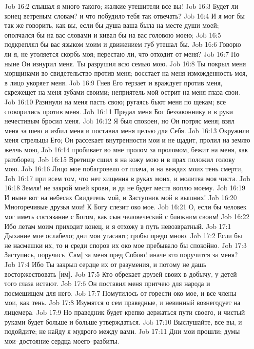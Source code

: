 Job 16:2  слышал я много такого; жалкие утешители все вы!
Job 16:3  Будет ли конец ветреным словам? и что побудило тебя так отвечать?
Job 16:4  И я мог бы так же говорить, как вы, если бы душа ваша была на месте души моей; ополчался бы на вас словами и кивал бы на вас головою моею;
Job 16:5  подкреплял бы вас языком моим и движением губ утешал бы.
Job 16:6  Говорю ли я, не утоляется скорбь моя; перестаю ли, что отходит от меня?
Job 16:7  Но ныне Он изнурил меня. Ты разрушил всю семью мою.
Job 16:8  Ты покрыл меня морщинами во свидетельство против меня; восстает на меня изможденность моя, в лицо укоряет меня.
Job 16:9  Гнев Его терзает и враждует против меня, скрежещет на меня зубами своими; неприятель мой острит на меня глаза свои.
Job 16:10  Разинули на меня пасть свою; ругаясь бьют меня по щекам; все сговорились против меня.
Job 16:11  Предал меня Бог беззаконнику и в руки нечестивым бросил меня.
Job 16:12  Я был спокоен, но Он потряс меня; взял меня за шею и избил меня и поставил меня целью для Себя.
Job 16:13  Окружили меня стрельцы Его; Он рассекает внутренности мои и не щадит, пролил на землю желчь мою,
Job 16:14  пробивает во мне пролом за проломом, бежит на меня, как ратоборец.
Job 16:15  Вретище сшил я на кожу мою и в прах положил голову мою.
Job 16:16  Лицо мое побагровело от плача, и на веждах моих тень смерти,
Job 16:17  при всем том, что нет хищения в руках моих, и молитва моя чиста.
Job 16:18  Земля! не закрой моей крови, и да не будет места воплю моему.
Job 16:19  И ныне вот на небесах Свидетель мой, и Заступник мой в вышних!
Job 16:20  Многоречивые друзья мои! К Богу слезит око мое.
Job 16:21  О, если бы человек мог иметь состязание с Богом, как сын человеческий с ближним своим!
Job 16:22  Ибо летам моим приходит конец, и я отхожу в путь невозвратный.
Job 17:1  Дыхание мое ослабело; дни мои угасают; гробы предо мною.
Job 17:2  Если бы не насмешки их, то и среди споров их око мое пребывало бы спокойно.
Job 17:3  Заступись, поручись [Сам] за меня пред Собою! иначе кто поручится за меня?
Job 17:4  Ибо Ты закрыл сердце их от разумения, и потому не дашь восторжествовать [им].
Job 17:5  Кто обрекает друзей своих в добычу, у детей того глаза истают.
Job 17:6  Он поставил меня притчею для народа и посмешищем для него.
Job 17:7  Помутилось от горести око мое, и все члены мои, как тень.
Job 17:8  Изумятся о сем праведные, и невинный вознегодует на лицемера.
Job 17:9  Но праведник будет крепко держаться пути своего, и чистый руками будет больше и больше утверждаться.
Job 17:10  Выслушайте, все вы, и подойдите; не найду я мудрого между вами.
Job 17:11  Дни мои прошли; думы мои--достояние сердца моего--разбиты.
